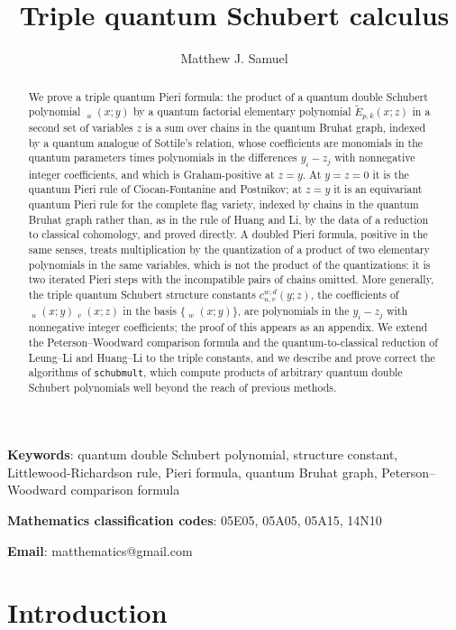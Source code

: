 \documentclass{amsart}
\title{Triple quantum Schubert calculus}
\author{Matthew J. Samuel}
\theoremstyle{definition}
\theoremstyle{remark}
\numberwithin{equation}{section}
\DeclareMathOperator{\qsch}{\widetilde{\mathfrak{S}}}
\newcommand{\qelem}{\widetilde{E}}
\begin{document}
\begin{abstract}
We prove a triple quantum Pieri formula: the product of a quantum double Schubert polynomial $\qsch_u(x;y)$ by a quantum factorial elementary polynomial $\qelem_{p,k}(x;z)$ in a second set of variables $z$ is a sum over chains in the quantum Bruhat graph, indexed by a quantum analogue of Sottile's relation, whose coefficients are monomials in the quantum parameters times polynomials in the differences $y_i-z_j$ with nonnegative integer coefficients, and which is Graham-positive at $z=y$. At $y=z=0$ it is the quantum Pieri rule of Ciocan-Fontanine and Postnikov; at $z=y$ it is an equivariant quantum Pieri rule for the complete flag variety, indexed by chains in the quantum Bruhat graph rather than, as in the rule of Huang and Li, by the data of a reduction to classical cohomology, and proved directly. A doubled Pieri formula, positive in the same senses, treats multiplication by the quantization of a product of two elementary polynomials in the same variables, which is not the product of the quantizations: it is two iterated Pieri steps with the incompatible pairs of chains omitted. More generally, the triple quantum Schubert structure constants $c_{u,v}^{w,d}(y;z)$, the coefficients of $\qsch_u(x;y)\qsch_v(x;z)$ in the basis $\{\qsch_w(x;y)\}$, are polynomials in the $y_i-z_j$ with nonnegative integer coefficients; the proof of this appears as an appendix. We extend the Peterson--Woodward comparison formula and the quantum-to-classical reduction of Leung--Li and Huang--Li to the triple constants, and we describe and prove correct the algorithms of \texttt{schubmult}, which compute products of arbitrary quantum double Schubert polynomials well beyond the reach of previous methods.
\end{abstract}
\maketitle

{\bf Keywords}: quantum double Schubert polynomial, structure constant, Littlewood-Richardson rule, Pieri formula, quantum Bruhat graph, Peterson--Woodward comparison formula

{\bf Mathematics classification codes}: 05E05, 05A05, 05A15, 14N10

{\bf Email}: matthematics@gmail.com

\section{Introduction}
\end{document}
